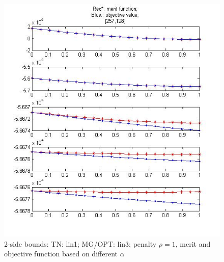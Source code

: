 \documentclass[10pt]{article}
\begin{document}
\begin{figure}
  \centering
  \includegraphics[width=1\textwidth]{merit13}
  \caption{2-side bounds: TN: lin1; MG/OPT: lin3; penalty $\rho=1$, merit and objective function based on different $\alpha$}
  \label{fig:merit13}
\end{figure}
\end{document}

